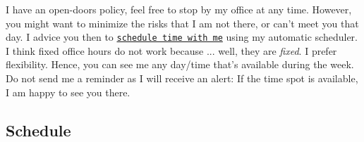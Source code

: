 \documentclass[letterpaper]{article}
\begin{document}
I have an open-doors policy, feel free to stop by my office at any time. However, you might want to minimize the risks that I am not there, or can't meet you that day. I advice you then to \href{https://calendly.com/bahamonde/officehours}{\texttt{schedule time with me}} using my automatic scheduler. I think fixed office hours do not work because ... well, they are \emph{fixed}. I prefer flexibility. Hence, you can see me any day/time that's available during the week. Do not send me a reminder as I will receive an alert: If the time spot is available, I am happy to see you there.



\subsection*{Schedule}
\end{document}
